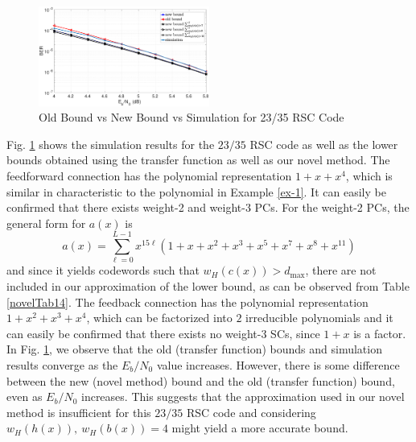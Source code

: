 \begin{example}
\begin{figure}[htbp]
	\centering
	\includegraphics[width=0.5\textwidth]{./Images/RSC_23_35_lower_weights2.eps}
	\caption{Old Bound vs New Bound vs Simulation for 23/35 RSC Code}
	\label{simFig3}
\end{figure}
Fig. \ref{simFig3} shows the simulation results for the $23/35$ RSC code as well as the lower bounds obtained using the transfer function as well as our novel method. The feedforward connection has the polynomial representation $1+x+x^4$, which is similar in characteristic to the polynomial in Example \ref{ex-1}. It can easily be confirmed that there exists weight-2 and weight-3 PCs. For the weight-2 PCs, the general form for $a(x)$ is
\begin{equation*}
	a(x)=\sum_{\ell=0}^{L-1} x^{15\ell}(1+x+x^{2}+x^3+x^5+x^7+x^8+x^{11})
\end{equation*}
and since it yields codewords such that $w_H(c(x))>d_{\text{max}}$, there are not included in our approximation of the lower bound, as can be observed from Table \ref{novelTab14}. The feedback connection has the polynomial representation $1+x^2+x^3+x^4$, which can be factorized into $2$ irreducible polynomials and it can easily be confirmed that there exists no weight-3 SCs, since $1+x$ is a factor. In Fig. \ref{simFig3}, we observe that the old (transfer function) bounds and simulation results converge as the $E_b/N_0$ value increases. However, there is some difference between the new (novel method) bound and the old (transfer function) bound, even as $E_b/N_0$ increases. This suggests that the approximation used in our novel method is insufficient for this $23/35$ RSC code and considering  $w_H(h(x)),~w_H(b(x))=4$ might yield a more accurate bound.
\end{example}





